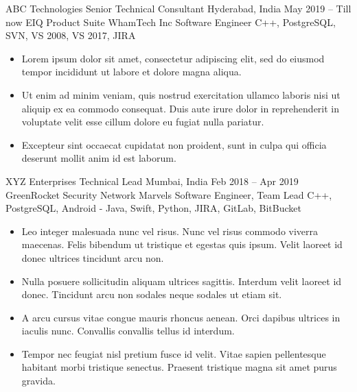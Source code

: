 \documentclass[10pt, a4paper]{sivu}
\begin{document}

    \company
        {ABC Technologies}
        {Senior Technical Consultant}
        {Hyderabad, India}
        {May 2019 -- Till now}
    \project
        {EIQ Product Suite}
        {WhamTech Inc}
        {Software Engineer}
        {C++, PostgreSQL, SVN, VS 2008, VS 2017, JIRA}
    
    \begin{itemize}
        \item Lorem ipsum dolor sit amet, consectetur adipiscing elit, sed do eiusmod tempor incididunt ut labore et dolore magna aliqua. \smallskip
        
        \item Ut enim ad minim veniam, quis nostrud exercitation ullamco laboris nisi ut aliquip ex ea commodo consequat. Duis aute irure dolor in reprehenderit in voluptate velit esse cillum dolore eu fugiat nulla pariatur.\smallskip

        \item Excepteur sint occaecat cupidatat non proident, sunt in culpa qui officia deserunt mollit anim id est laborum.\smallskip
    \end{itemize}
    
    

\smallskip
\divider
\smallskip

    \company
        {XYZ Enterprises}
        {Technical Lead}
        {Mumbai, India}
        {Feb 2018 – Apr 2019}
        \project
            {GreenRocket Security}
            {Network Marvels}
            {Software Engineer, Team Lead}
            {C++, PostgreSQL, Android - Java, Swift, Python, JIRA, GitLab, BitBucket}
        
        \begin{itemize}
            \item Leo integer malesuada nunc vel risus. Nunc vel risus commodo viverra maecenas. Felis bibendum ut tristique et egestas quis ipsum. Velit laoreet id donec ultrices tincidunt arcu non.\smallskip
            \item Nulla posuere sollicitudin aliquam ultrices sagittis. Interdum velit laoreet id donec. Tincidunt arcu non sodales neque sodales ut etiam sit.\smallskip
            \item A arcu cursus vitae congue mauris rhoncus aenean. Orci dapibus ultrices in iaculis nunc. Convallis convallis tellus id interdum.\smallskip
            \item Tempor nec feugiat nisl pretium fusce id velit. Vitae sapien pellentesque habitant morbi tristique senectus. Praesent tristique magna sit amet purus gravida.\smallskip
        \end{itemize}
\end{document}
